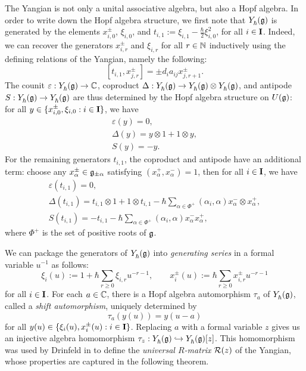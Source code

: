 The Yangian is not only a unital associative algebra, but also a Hopf algebra.
In order to write down the Hopf algebra structure, we first note that $\Yhg$ is generated by the elements $x^\pm_{i,0}$, $\xi_{i,0}$, and $t_{i,1} := \xi_{i,1}-\frac{\hbar}{2}\xi_{i,0}^2$, for all $i\in\I$.
Indeed, we can recover the generators $x^\pm_{i,r}$ and $\xi_{i,r}$ for all $r\in\N$ inductively using the defining relations of the Yangian, namely the following:
\[[t_{i,1}, x^\pm_{j,r}] = \pm d_ia_{ij}x^\pm_{j,r+1}.\]
The counit $\varepsilon:\Yhg\to\C$, coproduct $\Delta:\Yhg\to\Yhg\otimes\Yhg$, and antipode $S:\Yhg\to\Yhg$ are thus determined by the Hopf algebra structure on $\Ug$: for all $y\in\{x^\pm_{i,0},\xi_{i,0} : i\in\I\}$, we have
\begin{gather*}
    \varepsilon(y) = 0, \\
    \Delta(y) = y\otimes 1 + 1\otimes y, \\
    S(y) = -y.
\end{gather*}
For the remaining generators $t_{i,1}$, the coproduct and antipode have an additional term: choose any $x^\pm_\alpha\in\g_{\pm\alpha}$ satisfying $(x^+_\alpha,x^-_\alpha)=1$, then for all $i\in\I$, we have
\begin{gather*}
    \varepsilon(t_{i,1}) = 0, \\
    \Delta(t_{i,1}) = t_{i,1}\otimes 1 + 1\otimes t_{i,1} - \hbar\sum_{\alpha\in\Phi^+}(\alpha_i,\alpha) x^-_\alpha \otimes x^+_\alpha, \\
    S(t_{i,1}) = -t_{i,1} - \hbar\sum_{\alpha\in\Phi^+}(\alpha_i,\alpha) x^-_\alpha x^+_\alpha,
\end{gather*}
where $\Phi^+$ is the set of positive roots of $\g$.

We can package the generators of $\Yhg$ into \emph{generating series} in a formal variable $u^{-1}$ as follows:
\begin{equation}\label{eqn:gen-series}
    \xi_i(u) := 1+\hbar\sum_{r\geq 0}\xi_{i,r}u^{-r-1}, \qquad x^\pm_i(u) := \hbar\sum_{r\geq 0}x^\pm_{i,r}u^{-r-1}
\end{equation}
for all $i\in\I$.
For each $a\in\C$, there is a Hopf algebra automorphism $\tau_a$ of $\Yhg$, called a \emph{shift automorphism}, uniquely determined by
\[\tau_a(y(u)) = y(u-a)\]
for all $y(u)\in\{\xi_i(u),x^\pm_i(u) : i\in\I\}$.
Replacing $a$ with a formal variable $z$ gives us an injective algebra homomorphism $\tau_z:\Yhg\inj\Yhg[][z]$.
This homomorphism was used by Drinfeld in \cite{drinfeld_hopf_1985} to define the \emph{universal $R$-matrix} $\rmat(z)$ of the Yangian, whose properties are captured in the following theorem.

